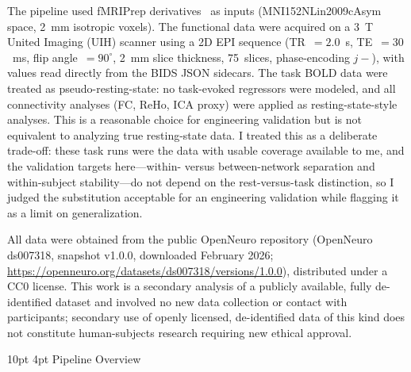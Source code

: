 \documentclass[12pt]{article}
\makeatletter
\renewcommand\subsection{%
  \@startsection{subsection}{2}{\z@}%
    {10pt \@plus 2pt \@minus 1pt}%
    {4pt}%
    {\normalfont\normalsize\bfseries}}
\makeatother
\begin{document}
The pipeline used fMRIPrep derivatives~\citep{esteban2019fmriprep} as
inputs (MNI152NLin2009cAsym space, 2~mm isotropic voxels). The
functional data were acquired on a 3~T United Imaging (UIH) scanner
using a 2D EPI sequence (TR~$= 2.0$~s, TE~$= 30$~ms, flip
angle~$= 90^\circ$, 2~mm slice thickness, 75~slices, phase-encoding
$j-$), with values read directly from the BIDS JSON sidecars. The task
BOLD data were treated as pseudo-resting-state: no task-evoked
regressors were modeled, and all connectivity analyses (FC, ReHo, ICA
proxy) were applied as resting-state-style analyses. This is a
reasonable choice for engineering validation but is not equivalent to
analyzing true resting-state data. I treated this as a deliberate
trade-off: these task runs were the data with usable coverage available
to me, and the validation targets here---within- versus between-network
separation and within-subject stability---do not depend on the
rest-versus-task distinction, so I judged the substitution acceptable
for an engineering validation while flagging it as a limit on
generalization.

All data were obtained from the public OpenNeuro repository
(OpenNeuro ds007318, snapshot v1.0.0, downloaded February 2026;
\url{https://openneuro.org/datasets/ds007318/versions/1.0.0}),
distributed under a CC0 license. This work is a secondary analysis of a
publicly available, fully de-identified dataset and involved no new
data collection or contact with participants; secondary use of openly
licensed, de-identified data of this kind does not constitute
human-subjects research requiring new ethical approval.

\subsection{Pipeline Overview}
\end{document}
